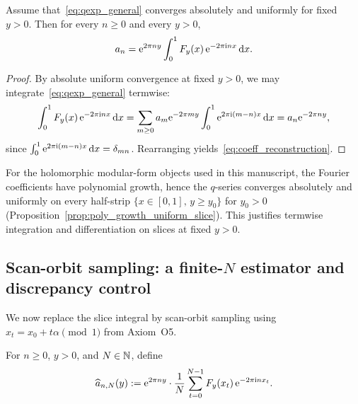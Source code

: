 \begin{theorem}
\label{thm:slice_coefficient_reconstruction}
Assume that~\eqref{eq:qexp_general} converges absolutely and uniformly for fixed $y>0$. Then for every $n\ge 0$ and every $y>0$,
\begin{equation}
\label{eq:coeff_reconstruction}
a_n = \mathrm{e}^{2\pi n y}\int_0^1 F_y(x)\,\mathrm{e}^{-2\pi \mathrm{i} n x}\,\mathrm{d} x.
\end{equation}
\end{theorem}
\begin{proof}
By absolute uniform convergence at fixed $y>0$, we may integrate~\eqref{eq:qexp_general} termwise:
\begin{equation}
\int_0^1 F_y(x)\,\mathrm{e}^{-2\pi\mathrm{i} n x}\,\mathrm{d} x
=\sum_{m\ge 0} a_m \mathrm{e}^{-2\pi m y}\int_0^1 \mathrm{e}^{2\pi \mathrm{i} (m-n)x}\,\mathrm{d} x
= a_n \mathrm{e}^{-2\pi n y},
\end{equation}
since $\int_0^1 \mathrm{e}^{2\pi\mathrm{i}(m-n)x}\,\mathrm{d} x=\delta_{mn}$. Rearranging yields~\eqref{eq:coeff_reconstruction}.
\end{proof}

\begin{remark}
For the holomorphic modular-form objects used in this manuscript, the Fourier coefficients have polynomial growth, hence the $q$-series converges absolutely and uniformly on every half-strip $\{x\in[0,1],\,y\ge y_0\}$ for $y_0>0$ (Proposition~\ref{prop:poly_growth_uniform_slice}). This justifies termwise integration and differentiation on slices at fixed $y>0$.
\end{remark}

\subsection{Scan-orbit sampling: a finite-\texorpdfstring{$N$}{N} estimator and discrepancy control}
\label{sec:sampling_estimator_discrepancy}

We now replace the slice integral by scan-orbit sampling using $x_t=x_0+t\alpha\pmod 1$ from Axiom~O5.

\begin{definition}
\label{def:scan_sampled_estimator}
For $n\ge 0$, $y>0$, and $N\in\mathbb{N}$, define
\begin{equation}
\label{eq:scan_estimator}
\widehat a_{n,N}(y)
:=\mathrm{e}^{2\pi n y}\cdot\frac{1}{N}\sum_{t=0}^{N-1}F_y(x_t)\,\mathrm{e}^{-2\pi \mathrm{i} n x_t}.
\end{equation}
\end{definition}

